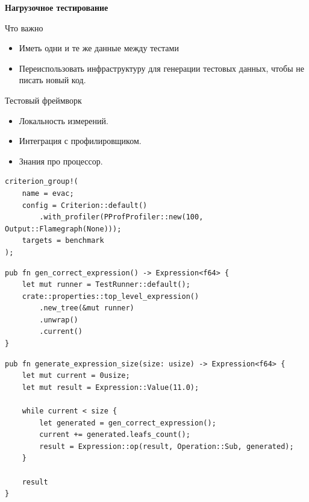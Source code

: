 \begin{frame}
  \textbf{Нагрузочное тестирование}
\end{frame}

\begin{frame}{Что важно}
  \begin{itemize}
    \item Иметь одни и те же данные между тестами
    \item Переиспользовать инфраструктуру для генерации тестовых
          данных, чтобы не писать новый код.
  \end{itemize}
\end{frame}

\begin{frame}{Тестовый фреймворк}
  \begin{itemize}
    \item Локальность измерений.
    \item Интеграция с профилировщиком.
    \item Знания про процессор.
  \end{itemize}
\end{frame}

\begin{frame}[fragile]
    \begin{verbatim}
criterion_group!(
    name = evac;
    config = Criterion::default()
        .with_profiler(PProfProfiler::new(100, Output::Flamegraph(None)));
    targets = benchmark
);
    \end{verbatim}
\end{frame}

\begin{frame}[fragile]
    \begin{verbatim}
pub fn gen_correct_expression() -> Expression<f64> {
    let mut runner = TestRunner::default();
    crate::properties::top_level_expression()
        .new_tree(&mut runner)
        .unwrap()
        .current()
}
    \end{verbatim}
\end{frame}

\begin{frame}[fragile]
    \begin{verbatim}
pub fn generate_expression_size(size: usize) -> Expression<f64> {
    let mut current = 0usize;
    let mut result = Expression::Value(11.0);

    while current < size {
        let generated = gen_correct_expression();
        current += generated.leafs_count();
        result = Expression::op(result, Operation::Sub, generated);
    }

    result
}
    \end{verbatim}
\end{frame}

